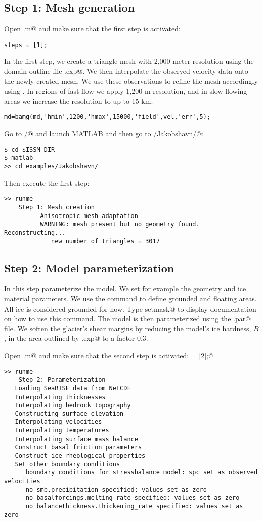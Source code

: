\subsection{Step 1: Mesh generation}
Open \verb@runme.m@ and make sure that the first step is activated:
\begin{verbatim}steps = [1];\end{verbatim}
In the first step, we create a triangle mesh with 2,000 meter resolution using the domain outline file \verb@Domain.exp@. We then interpolate the observed velocity data onto the newly-created mesh. We use these observations to refine the mesh accordingly using \verb@bamg@. In regions of fast flow we apply 1,200 m resolution, and in slow flowing areas we increase the resolution to up to 15 km:
\begin{verbatim}md=bamg(md,'hmin',1200,'hmax',15000,'field',vel,'err',5);\end{verbatim}

Go to \verb@trunk/@ and launch MATLAB and then go to \verb@examples/Jakobshavn/@:
\begin{verbatim}$ cd $ISSM_DIR
$ matlab
>> cd examples/Jakobshavn/\end{verbatim}

Then execute the first step:
\begin{verbatim}>> runme
	Step 1: Mesh creation
		  Anisotropic mesh adaptation
		  WARNING: mesh present but no geometry found. Reconstructing...
		     new number of triangles = 3017\end{verbatim}

\subsection{Step 2: Model parameterization}
In this step parameterize the model. We set for example the geometry and ice material parameters. We use the \verb@setmask@ command to define grounded and floating areas. All ice is considered grounded for now. Type \verb@help setmask@ to display documentation on how to use this command. The model is then parameterized using the \verb@Jks.par@ file. We soften the glacier's shear margins by reducing the model's ice hardness, $B$, in the area outlined by \verb@WeakB.exp@ to a factor 0.3.

Open \verb@runme.m@ and make sure that the second step is activated: \verb@steps = [2];@
\begin{verbatim}>> runme
	Step 2: Parameterization
   Loading SeaRISE data from NetCDF
   Interpolating thicknesses
   Interpolating bedrock topography
   Constructing surface elevation
   Interpolating velocities
   Interpolating temperatures
   Interpolating surface mass balance
   Construct basal friction parameters
   Construct ice rheological properties
   Set other boundary conditions
      boundary conditions for stressbalance model: spc set as observed velocities
      no smb.precipitation specified: values set as zero
      no basalforcings.melting_rate specified: values set as zero
      no balancethickness.thickening_rate specified: values set as zero\end{verbatim}

